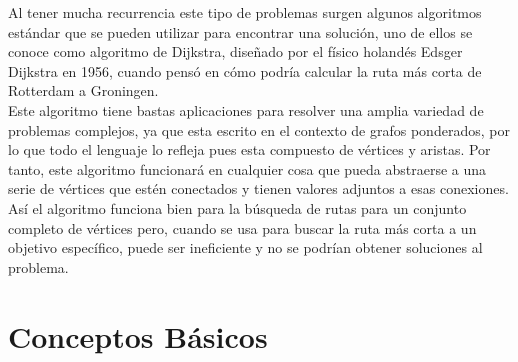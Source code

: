 \documentclass[12pt,twoside]{article}
\begin{document}
Al tener mucha recurrencia este tipo de problemas surgen algunos algoritmos est\'andar que se pueden utilizar para encontrar una soluci\'on, uno de ellos se conoce como algoritmo de Dijkstra, diseñado por el f\'isico holand\'es Edsger Dijkstra en 1956, cuando pens\'o en c\'omo podr\'ia calcular la ruta m\'as corta de Rotterdam a Groningen.\\
Este algoritmo tiene bastas aplicaciones para resolver una amplia variedad de problemas complejos, ya que esta escrito en el contexto de grafos ponderados, por lo que todo el lenguaje lo refleja pues esta compuesto de v\'ertices y aristas. 
Por tanto, este algoritmo funcionar\'a en cualquier cosa que pueda abstraerse a una serie de vértices que est\'en conectados y tienen valores adjuntos a esas conexiones.\\

As\'i el algoritmo funciona bien para la b\'usqueda de rutas para un conjunto completo de vértices pero, cuando se usa para buscar la ruta más corta a un objetivo espec\'ifico, puede ser ineficiente y no se podrían obtener soluciones al problema.

\section{Conceptos B\'asicos}
\end{document}

